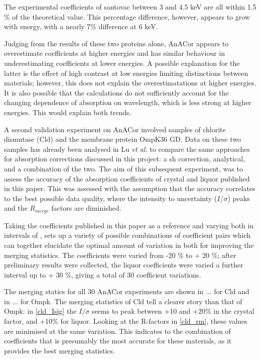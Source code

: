 The experimental coefficients of santovac between 3 and 4.5 keV are all within 1.5 \% of the theoretical value. This percentage difference, however, appears to grow with energy, with a nearly 7\% difference at 6 keV.

Judging from the results of these two proteins alone, AnACor appears to overestimate coefficients at higher energies and has similar behaviour in underestimating coefficients at lower energies. A possible explanation for the latter is the effect of high contrast at low energies limiting distinctions between materials; however, this does not explain the overestimatations at higher energies. It is also possible that the calculations do not sufficiently account for the changing dependence of absorption on wavelength, which is less strong at higher energies. This would explain both trends.

A second validation experiment on AnACor involved samples of chlorite dismutase (Cld) and the membrane protein OmpK36 GD. Data on these two samples has already been analysed in Lu \textit{et al.} \cite{Lu} to compare the same approaches for absorption corrections discussed in this project: a \ac{sh} correction, analytical, and a combination of the two. The aim of this subsequent experiment, was to assess the accuracy of the absorption coefficients of crystal and liquor published in this paper. This was assessed with the assumption that the accuracy correlates to the best possible data quality, where the intensity to uncertainty ($I / \sigma$) peaks and the $R_{merge}$ factors are diminished.

Taking the coefficients published in this paper as a reference and varying both in intervals of , sets up a variety of possible combinations of coefficient pairs which can together elucidate the optimal amount of variation in both for improving the merging statistics. The coefficients were varied from -20 \% to + 20 \%; after preliminary results were collected, the liquor coefficients were varied a further interval up to + 30 \%, giving a total of 30 coefficient variations. %

The merging statics for all 30 AnACor experiments are shown in ... for Cld and in ... for Ompk. The merging statistics of Cld tell a clearer story than that of Ompk: in \cref{cld_Isig} the $I/\sigma$ seems to peak between +10 and +20\% in the crystal factor, and +10\% for liquor. Looking at the R-factors in \cref{cld_rm}, these values are minimised at the same variation. This indicates to the combination of coefficients that is presumably the most accurate for these materials, as it provides the best merging statistics.

